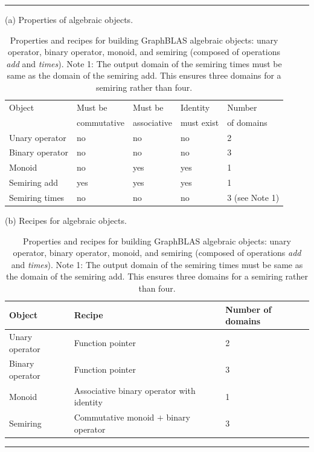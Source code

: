 \begin{table}
	\hrule
	\begin{center}
		\caption{Properties and recipes for building GraphBLAS algebraic objects: unary operator, binary operator, monoid, and semiring (composed of operations \emph{add} and \emph{times}).\newline
		\hspace{\textwidth}Note 1: The output domain of the semiring times must be same as the domain of the semiring add. This ensures three domains for a semiring rather than four.}
		\label{Tab:AlgebraicObjects}
		
		\vspace{1\baselineskip}
		(a) Properties of algebraic objects.
		\vspace{1\baselineskip}
		
		\begin{tabular}{l|l|l|l|l}
			Object 		& Must be  	& Must be  	& Identity 	& Number \\
			       		& commutative 	& associative 	& must exist 	& of domains  \\
            \hline
			Unary operator 	& no		& no		& no 		& 2 \\
			Binary operator & no		& no 		& no 		& 3  \\
			Monoid          & no		& yes 		& yes 		& 1  \\
			Semiring add 	& yes		& yes 		& yes  		& 1  \\
			Semiring times 	& no		& no 		& no 		& 3  (see Note 1) \\
		\end{tabular}
		
		\vspace{1\baselineskip}
		(b) Recipes for algebraic objects.
		\vspace{1\baselineskip}
		
		\begin{tabular}{l|l|l}
			Object          & Recipe                			            & Number of domains  \\ 
                        \hline
			Unary operator  & Function pointer      			            & 2 \\				
			Binary operator & Function pointer      			            & 3  \\	
			Monoid          & Associative binary operator with identity 	& 1  \\
			Semiring        & Commutative monoid $+$ binary operator 	    & 3 \\
		\end{tabular}
		
	\end{center}
	\hrule
\end{table}

